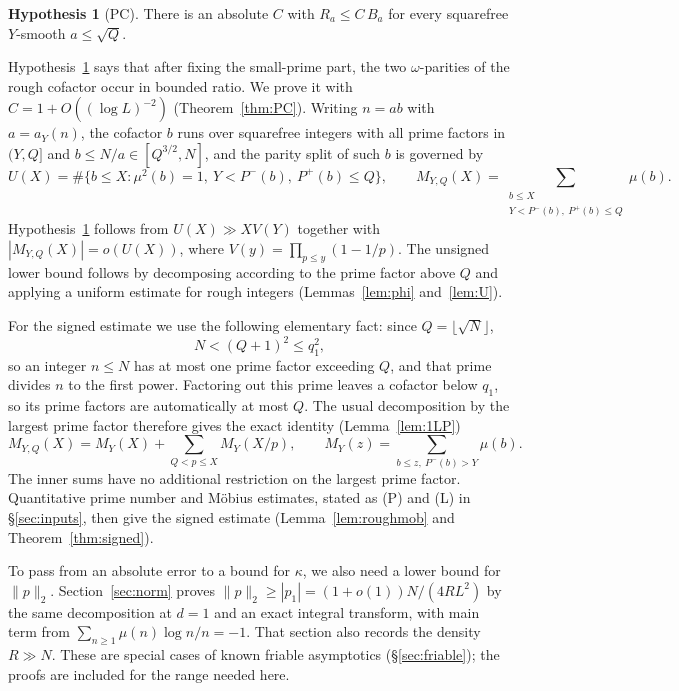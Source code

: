 \documentclass[11pt,a4paper]{article}
\theoremstyle{plain}
\theoremstyle{definition}
\newtheorem{hypothesis}[theorem]{Hypothesis}
\theoremstyle{remark}
\newcommand{\Pp}{P^{+}}
\newcommand{\Pm}{P^{-}}
\begin{document}
\begin{hypothesis}[PC]\label{hyp:PC}
There is an absolute $C$ with $R_{a}\le C\,B_{a}$ for every squarefree $Y$-smooth $a\le\sqrt Q$.
\end{hypothesis}

Hypothesis~\ref{hyp:PC} says that after fixing the small-prime part, the two $\omega$-parities of the rough
cofactor occur in bounded ratio. We prove it with $C=1+O((\log L)^{-2})$ (Theorem~\ref{thm:PC}). Writing
$n=ab$ with $a=a_{Y}(n)$, the cofactor $b$ runs over squarefree integers with all prime factors in $(Y,Q]$
and $b\le N/a\in[Q^{3/2},N]$, and the parity split of such $b$ is governed by
\begin{equation}\label{eq:UM}
  U(X)=\#\{b\le X:\mu^{2}(b)=1,\ Y<\Pm(b),\ \Pp(b)\le Q\},\qquad
  M_{Y,Q}(X)=\!\!\!\sum_{\substack{b\le X\\ Y<\Pm(b),\ \Pp(b)\le Q}}\!\!\!\mu(b).
\end{equation}
Hypothesis~\ref{hyp:PC} follows from $U(X)\gg XV(Y)$ together with $|M_{Y,Q}(X)|=o(U(X))$, where
$V(y)=\prod_{p\le y}(1-1/p)$. The unsigned lower bound follows by decomposing according to the prime factor above $Q$
and applying a uniform estimate for rough integers (Lemmas~\ref{lem:phi} and~\ref{lem:U}).

For the signed estimate we use the following elementary fact: since $Q=\lfloor\sqrt N\rfloor$,
\[
  N<(Q+1)^{2}\le q_{1}^{2},
\]
so an integer $n\le N$ has at most one prime factor exceeding $Q$, and that prime divides $n$ to the first
power. Factoring out this prime leaves a cofactor below $q_1$, so its prime factors are
automatically at most $Q$. The usual decomposition by the largest prime factor therefore gives
the exact identity (Lemma~\ref{lem:1LP})
\[
  M_{Y,Q}(X)=M_{Y}(X)+\sum_{Q<p\le X}M_{Y}(X/p),\qquad
  M_{Y}(z)=\!\!\sum_{b\le z,\ \Pm(b)>Y}\!\!\mu(b).
\]
The inner sums have no additional restriction on the largest prime factor. Quantitative prime number
and M\"obius estimates, stated as (P) and (L) in \S\ref{sec:inputs}, then give the signed estimate
(Lemma~\ref{lem:roughmob} and Theorem~\ref{thm:signed}).

To pass from an absolute error to a bound for $\kappa$, we also need a lower bound for $\|p\|_2$.
Section~\ref{sec:norm} proves
$\|p\|_2\ge|p_1|=(1+o(1))N/(4RL^2)$ by the same decomposition at $d=1$ and an exact integral
transform, with main term from $\sum_{n\ge1}\mu(n)\log n/n=-1$.
That section also records the density $R\gg N$. These are special cases of known friable asymptotics
(\S\ref{sec:friable}); the proofs are included for the range needed here.
\end{document}
